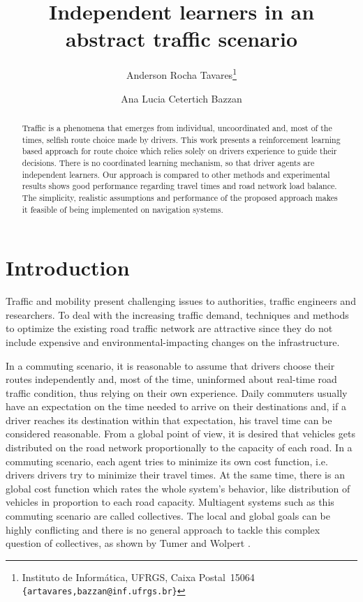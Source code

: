 \documentclass{RITA}
\author{
  Anderson Rocha Tavares\footnote{Instituto de Inform\'atica, UFRGS, Caixa Postal~15064\\
  \texttt{\{artavares,bazzan@inf.ufrgs.br\}}}
  \and Ana Lucia Cetertich Bazzan\footnotemark[1]
}
\title{Independent learners in an abstract traffic scenario}
\begin{document}
\maketitle

\begin{abstract}
Traffic is a phenomena that emerges from individual, uncoordinated and, most of the times, selfish route choice made by drivers. This work presents a reinforcement learning based approach for route choice which relies solely on drivers experience to guide their decisions. There is no coordinated learning mechanism, so that driver agents are independent learners. Our approach is compared to other methods and experimental results shows good performance regarding travel times and road network load balance. The simplicity, realistic assumptions and performance of the proposed approach makes it feasible of being implemented on navigation systems.
\end{abstract}





\section{Introduction}
\label{sec:intro}

Traffic and mobility present challenging issues to authorities, traffic engineers and researchers. To deal with the increasing traffic demand, techniques and methods to optimize the existing road traffic network are attractive since they do not include expensive and environmental-impacting changes on the infrastructure.

In a commuting scenario, it is reasonable to assume that drivers choose their routes independently and, most of the time, uninformed about real-time road traffic condition, thus relying on their own experience. Daily commuters usually have an expectation on the time needed to arrive on their destinations and, if a driver reaches its destination within that expectation, his travel time can be considered  reasonable. From a global point of view, it is desired that vehicles gets distributed on the road network proportionally to the capacity of each road. In a commuting scenario, each agent tries to minimize its own cost function, i.e. drivers drivers try to minimize their travel times. At the same time, there is an global cost function which rates the whole system's behavior, like distribution of vehicles in proportion to each road capacity. Multiagent systems such as this commuting scenario are called collectives. The local and global goals can be highly conflicting and there is no general approach to tackle this complex question of collectives, as shown by Tumer and Wolpert \cite{Tumer&Wolpert2004}.
\end{document}
